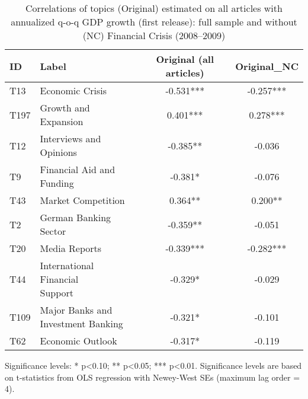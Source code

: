 \begin{table}[h!]
  \centering
  \caption{Correlations of topics (Original) estimated on all articles with annualized q-o-q GDP growth (first release): full sample and without (NC) Financial Crisis (2008–2009)}
  \label{tab:cor_gdp_topics_all_articles_sig}
  \begin{threeparttable}
    \footnotesize
    \renewcommand{\arraystretch}{1.3}

\begin{tabular}{llcc}
\toprule
ID & Label & Original (all articles) & Original\_NC\\
\midrule
T13 & Economic Crisis & -0.531*** & -0.257***\\
T197 & Growth and Expansion & 0.401*** & 0.278***\\
T12 & Interviews and Opinions & -0.385** & -0.036\\
T9 & Financial Aid and Funding & -0.381* & -0.076\\
T43 & Market Competition & 0.364** & 0.200**\\
\addlinespace
T2 & German Banking Sector & -0.359** & -0.051\\
T20 & Media Reports & -0.339*** & -0.282***\\
T44 & \makecell[tl]{International Financial \\ Support} & -0.329* & -0.029\\
T109 & \makecell[tl]{Major Banks and \\ Investment Banking} & -0.321* & -0.101\\
T62 & Economic Outlook & -0.317* & -0.119\\
\bottomrule
\end{tabular}

    \begin{tablenotes}[flushleft]
      \small
      \item Significance levels: * p<0.10; ** p<0.05; *** p<0.01. Significance levels are based on t-statistics from OLS regression with Newey-West SEs (maximum lag order = 4).
    \end{tablenotes}
  \end{threeparttable}
\end{table}

